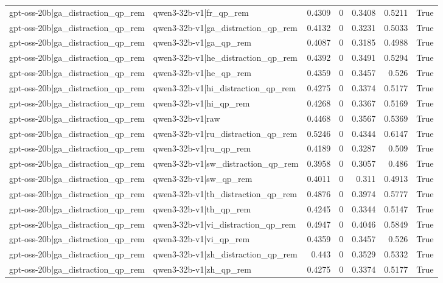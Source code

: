 \begin{table}
\begin{tabular}{l l r r r r l}
gpt-oss-20b|ga_distraction_qp_rem & qwen3-32b-v1|fr_qp_rem & 0.4309 & 0 & 0.3408 & 0.5211 & True \\
gpt-oss-20b|ga_distraction_qp_rem & qwen3-32b-v1|ga_distraction_qp_rem & 0.4132 & 0 & 0.3231 & 0.5033 & True \\
gpt-oss-20b|ga_distraction_qp_rem & qwen3-32b-v1|ga_qp_rem & 0.4087 & 0 & 0.3185 & 0.4988 & True \\
gpt-oss-20b|ga_distraction_qp_rem & qwen3-32b-v1|he_distraction_qp_rem & 0.4392 & 0 & 0.3491 & 0.5294 & True \\
gpt-oss-20b|ga_distraction_qp_rem & qwen3-32b-v1|he_qp_rem & 0.4359 & 0 & 0.3457 & 0.526 & True \\
gpt-oss-20b|ga_distraction_qp_rem & qwen3-32b-v1|hi_distraction_qp_rem & 0.4275 & 0 & 0.3374 & 0.5177 & True \\
gpt-oss-20b|ga_distraction_qp_rem & qwen3-32b-v1|hi_qp_rem & 0.4268 & 0 & 0.3367 & 0.5169 & True \\
gpt-oss-20b|ga_distraction_qp_rem & qwen3-32b-v1|raw & 0.4468 & 0 & 0.3567 & 0.5369 & True \\
gpt-oss-20b|ga_distraction_qp_rem & qwen3-32b-v1|ru_distraction_qp_rem & 0.5246 & 0 & 0.4344 & 0.6147 & True \\
gpt-oss-20b|ga_distraction_qp_rem & qwen3-32b-v1|ru_qp_rem & 0.4189 & 0 & 0.3287 & 0.509 & True \\
gpt-oss-20b|ga_distraction_qp_rem & qwen3-32b-v1|sw_distraction_qp_rem & 0.3958 & 0 & 0.3057 & 0.486 & True \\
gpt-oss-20b|ga_distraction_qp_rem & qwen3-32b-v1|sw_qp_rem & 0.4011 & 0 & 0.311 & 0.4913 & True \\
gpt-oss-20b|ga_distraction_qp_rem & qwen3-32b-v1|th_distraction_qp_rem & 0.4876 & 0 & 0.3974 & 0.5777 & True \\
gpt-oss-20b|ga_distraction_qp_rem & qwen3-32b-v1|th_qp_rem & 0.4245 & 0 & 0.3344 & 0.5147 & True \\
gpt-oss-20b|ga_distraction_qp_rem & qwen3-32b-v1|vi_distraction_qp_rem & 0.4947 & 0 & 0.4046 & 0.5849 & True \\
gpt-oss-20b|ga_distraction_qp_rem & qwen3-32b-v1|vi_qp_rem & 0.4359 & 0 & 0.3457 & 0.526 & True \\
gpt-oss-20b|ga_distraction_qp_rem & qwen3-32b-v1|zh_distraction_qp_rem & 0.443 & 0 & 0.3529 & 0.5332 & True \\
gpt-oss-20b|ga_distraction_qp_rem & qwen3-32b-v1|zh_qp_rem & 0.4275 & 0 & 0.3374 & 0.5177 & True \\

\end{tabular}
\end{table}
